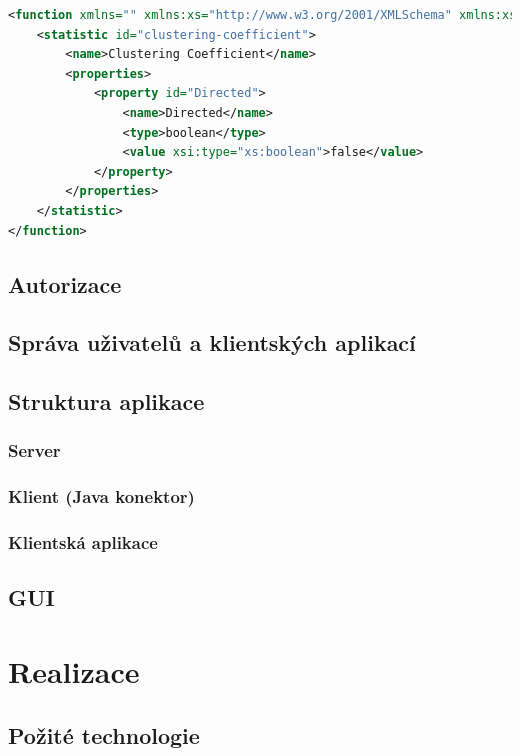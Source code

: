 \documentclass[thesis=M,czech]{FITthesis}[2014/05/6]
\begin{document}
\begin{lstlisting}[caption=Tělo požadavku zdroje /users/\{username\}/graphs/\{graph\_id\} (PUT), label=rest:req:graph-apply-func, language=xml]
<function xmlns="" xmlns:xs="http://www.w3.org/2001/XMLSchema" xmlns:xsi="http://www.w3.org/2001/XMLSchema-instance">
    <statistic id="clustering-coefficient">
        <name>Clustering Coefficient</name>
        <properties>
            <property id="Directed">
                <name>Directed</name>
                <type>boolean</type>
                <value xsi:type="xs:boolean">false</value>
            </property>
        </properties>
    </statistic>
</function>
\end{lstlisting}  

\section{Autorizace}\label{roles}

\section{Správa uživatelů a klientských aplikací}

\section{Struktura aplikace}
\subsection{Server}
\subsection{Klient (Java konektor)}
\subsection{Klientská aplikace}

\section{GUI}

\chapter{Realizace}

\section{Požité technologie}
\end{document}

